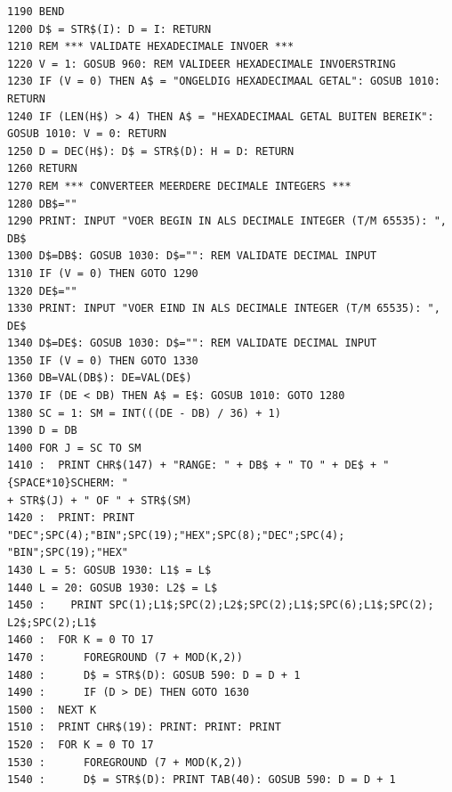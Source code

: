 \begin{tcolorbox}[colback=black,coltext=white]
\verbatimfont{\codefont}
\begin{verbatim}
1190 BEND
1200 D$ = STR$(I): D = I: RETURN
1210 REM *** VALIDATE HEXADECIMALE INVOER ***
1220 V = 1: GOSUB 960: REM VALIDEER HEXADECIMALE INVOERSTRING
1230 IF (V = 0) THEN A$ = "ONGELDIG HEXADECIMAAL GETAL": GOSUB 1010: RETURN
1240 IF (LEN(H$) > 4) THEN A$ = "HEXADECIMAAL GETAL BUITEN BEREIK":
GOSUB 1010: V = 0: RETURN
1250 D = DEC(H$): D$ = STR$(D): H = D: RETURN
1260 RETURN
1270 REM *** CONVERTEER MEERDERE DECIMALE INTEGERS ***
1280 DB$=""
1290 PRINT: INPUT "VOER BEGIN IN ALS DECIMALE INTEGER (T/M 65535): ", DB$
1300 D$=DB$: GOSUB 1030: D$="": REM VALIDATE DECIMAL INPUT
1310 IF (V = 0) THEN GOTO 1290
1320 DE$=""
1330 PRINT: INPUT "VOER EIND IN ALS DECIMALE INTEGER (T/M 65535): ", DE$
1340 D$=DE$: GOSUB 1030: D$="": REM VALIDATE DECIMAL INPUT
1350 IF (V = 0) THEN GOTO 1330
1360 DB=VAL(DB$): DE=VAL(DE$)
1370 IF (DE < DB) THEN A$ = E$: GOSUB 1010: GOTO 1280
1380 SC = 1: SM = INT(((DE - DB) / 36) + 1)
1390 D = DB
1400 FOR J = SC TO SM
1410 :  PRINT CHR$(147) + "RANGE: " + DB$ + " TO " + DE$ + "{SPACE*10}SCHERM: "
+ STR$(J) + " OF " + STR$(SM)
1420 :  PRINT: PRINT "DEC";SPC(4);"BIN";SPC(19);"HEX";SPC(8);"DEC";SPC(4);
"BIN";SPC(19);"HEX"
1430 L = 5: GOSUB 1930: L1$ = L$
1440 L = 20: GOSUB 1930: L2$ = L$
1450 :    PRINT SPC(1);L1$;SPC(2);L2$;SPC(2);L1$;SPC(6);L1$;SPC(2);
L2$;SPC(2);L1$
1460 :  FOR K = 0 TO 17
1470 :      FOREGROUND (7 + MOD(K,2))
1480 :      D$ = STR$(D): GOSUB 590: D = D + 1
1490 :      IF (D > DE) THEN GOTO 1630
1500 :  NEXT K
1510 :  PRINT CHR$(19): PRINT: PRINT: PRINT
1520 :  FOR K = 0 TO 17
1530 :      FOREGROUND (7 + MOD(K,2))
1540 :      D$ = STR$(D): PRINT TAB(40): GOSUB 590: D = D + 1

\end{verbatim}
\end{tcolorbox}
